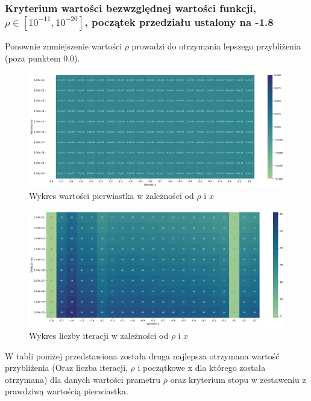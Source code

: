 \documentclass{article}
\begin{document}
\subsubsection{Kryterium wartości bezwzględnej wartości funkcji, \(\rho \in [10^{-11}, 10^{-20}]\), początek przedziału ustalony na -1.8}

Ponownie zmniejszenie wartości \(\rho\) prowadzi do otrzymania lepszego przybliżenia (poza punktem 0.0).

\begin{figure}[H]
  \centering
  \begin{minipage}[b]{\textwidth}
    \includegraphics[width=\textwidth]{heatmap11.png}
  \end{minipage}
  \caption{Wykres wartości pierwiastka w zależności od \(\rho\) i \(x\)}
\end{figure}

\begin{figure}[H]
  \centering
  \begin{minipage}[b]{\textwidth}
    \includegraphics[width=\textwidth]{heatmap12.png}
  \end{minipage}
  \caption{Wykres liczby iteracji w zależności od \(\rho\) i \(x\)}
\end{figure}

\noindent
W tabli poniżej przedstawiona została druga najlepsza otrzymana wartość przybliżenia (Oraz liczba iteracji, \(\rho\) i początkowe x dla którego została otrzymana) dla danych wartości prametru \(\rho\) oraz kryterium stopu w zestaweniu z prawdziwą wartością pierwiastka.
\end{document}
